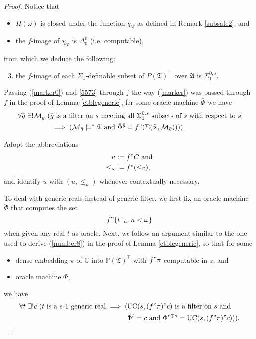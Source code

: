 \documentclass[12pt]{article}
\numberwithin{equation}{section}
\begin{document}
\begin{proof}
Notice that
\begin{itemize}
    \item $H(\omega)$ is closed under the function $\chi_{\mathfrak{T}}$ as defined in Remark \ref{subsafe2}, and 
    \item the $f$-image of $\chi_{\mathfrak{T}}$ is $\Delta^0_0$ (i.e. computable),
\end{itemize} 
from which we deduce the following:
\begin{enumerate}[label=(\Roman*)]
    \setcounter{enumi}{2}
    \item\label{5573} the $f$-image of each $\Sigma_1$-definable subset of $P(\mathfrak{T})^{\top}$ over $\mathfrak{A}$ is $\Sigma^{0, s}_1$.
\end{enumerate}

Passing (\ref{marker0}) and \ref{5573} through $f$ the way (\ref{marker}) was passed through $f$ in the proof of Lemma \ref{ctblegeneric}, for some oracle machine $\bar{\Phi}$ we have
\begin{align}\label{number9}
\begin{split}
    \forall \bar{g} \ \exists ! \mathcal{M}_{\bar{g}} \ ( & \bar{g} \text{ is a filter on } s \text{ meeting all } \Sigma^{0, s}_1 \text{ subsets of } s \text{ with respect to } s \\
    & \implies (\mathcal{M}_{\bar{g}} \models^* \mathfrak{T} \text{ and } \bar{\Phi}^{\bar{g}} = f" (\Sigma(\mathfrak{T}, \mathcal{M}_{\bar{g}})))) \text{.}
\end{split}
\end{align}

Adopt the abbreviations
\begin{align*}
    u := \ & f" C \text{ and} \\
    \leq_u \ := \ & f" (\leq_{\mathbb{C}}) \text{,}
\end{align*}
and identify $u$ with $(u, \leq_u)$ whenever contextually necessary. 

To deal with generic reals instead of generic filter, we first fix an oracle machine $\ddot{\Phi}$ that computes the set $$f" \{t \! \restriction_n : n < \omega\}$$ when given any real $t$ as oracle. Next, we follow an argument similar to the one used to derive (\ref{number8}) in the proof of Lemma \ref{ctblegeneric}, so that for some 
\begin{itemize}
    \item dense embedding $\pi$ of $\mathbb{C}$ into $\mathbb{P}(\mathfrak{T})^{\top}$ with $f" \pi$ computable in $s$, and 
    \item oracle machine $\Phi$, 
\end{itemize}
we have
\begin{align}\label{number10}
\begin{split}
    \forall t \ \exists ! c \ (t \text{ is a } s \text{-} 1 \text{-generic real} \implies ( & \mathrm{UC}(s, (f" \pi)" c) \text{ is a filter on } s \text{ and} \\
    & \ddot{\Phi}^t = c \text{ and } \Phi^{c \oplus s} = \mathrm{UC}(s, (f" \pi)" c))) \text{.}
\end{split}
\end{align}


\end{proof}
\end{document}
